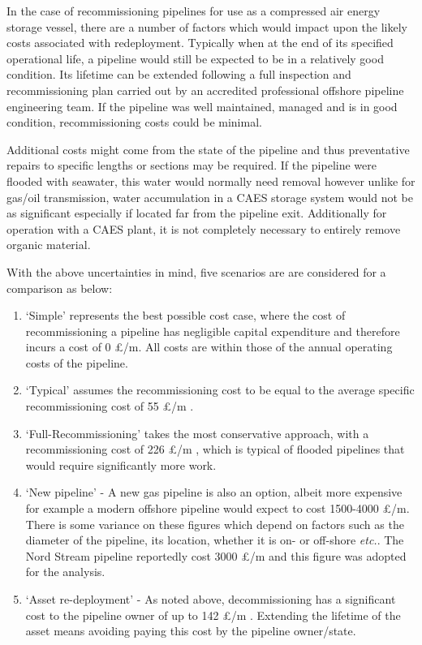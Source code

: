 \documentclass[preprint,12pt]{elsarticle}
\begin{document}
In the case of recommissioning pipelines for use as a compressed air energy storage vessel, there are a number of factors which would impact upon the likely costs associated with redeployment. Typically when at the end of its specified operational life, a pipeline would still be expected to be in a relatively good condition. Its lifetime can be extended following a full inspection and recommissioning plan carried out by an accredited professional offshore pipeline engineering team. If the pipeline was well maintained, managed and is in good condition, recommissioning costs could be minimal.

Additional costs might come from the state of the pipeline and thus preventative repairs to specific lengths or sections may be required. If the pipeline were flooded with seawater, this water would normally need removal however unlike for gas/oil transmission, water accumulation in a CAES storage system would not be as significant especially if located far from the pipeline exit. Additionally for operation with a CAES plant, it is not completely necessary to entirely remove organic material. 

With the above uncertainties in mind, five scenarios are are considered for a comparison as below:

\begin{enumerate}
    \item `Simple' represents the best possible cost case, where the cost of recommissioning a pipeline has negligible capital expenditure and therefore incurs a cost of 0 £/m. All costs are within those of the annual operating costs of the pipeline.
    \item `Typical' assumes the recommissioning cost to be equal to the average specific recommissioning cost of 55 £/m \cite{OGUKdecom}.
    \item `Full-Recommissioning' takes the most conservative approach, with a recommissioning cost of 226 £/m \cite{OGUKdecom}, which is typical of flooded pipelines that would require significantly more work. 
    \item `New pipeline' - A new gas pipeline is also an option, albeit more expensive \cite{wiki} for example a modern offshore pipeline would expect to cost 1500-4000 £/m. There is some variance on these figures which depend on factors such as the diameter of the pipeline, its location, whether it is on- or off-shore \textit{etc.}. The Nord Stream pipeline reportedly cost 3000 £/m and this figure was adopted for the analysis.
    \item `Asset re-deployment' - As noted above, decommissioning has a significant cost to the pipeline owner of up to 142 £/m \cite{KAISER2017167}. Extending the lifetime of the asset means avoiding paying this cost by the pipeline owner/state. 

\end{enumerate}
\end{document}
